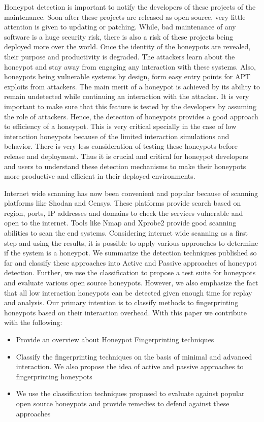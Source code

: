 \documentclass[letterpaper, 10 pt, conference]{ieeeconf}  %
\begin{document}
Honeypot detection is important to notify the developers of these projects of the maintenance. Soon after these projects are released as open source, very little attention is given to updating or patching. While, bad maintenance of any software is a huge security risk, there is also a risk of these projects being deployed more over the world. Once the identity of the honeypots are revealed, their purpose and productivity is degraded. The attackers learn about the honeypot and stay away from engaging any interaction with these systems. Also, honeypots being vulnerable systems by design, form easy entry points for APT exploits from attackers. The main merit of a honeypot is achieved by its ability to remain undetected while continuing an interaction with the attacker. It is very important to make sure that this feature is tested by the developers by assuming the role of attackers. Hence, the detection of honeypots provides a good approach to efficiency of a honeypot. This is very critical specially in the case of low interaction honeypots because of the limited interaction simulations and behavior. There is very less consideration of testing these honeypots before release and deployment. Thus it is crucial and critical for honeypot developers and users to understand these detection mechanisms to make their honeypots more productive and efficient in their deployed environments. 


Internet wide scanning has now been convenient and popular because of scanning platforms like Shodan and Censys. These platforms provide search based on region, ports, IP addresses and domains to check the services vulnerable and  open to the internet. Tools like Nmap \cite{NMap} and Xprobe2 provide good scanning abilities to scan the end systems. Considering internet wide scanning as a first step and using the results, it is possible to apply various approaches to determine if the system is a honeypot. We summarize the detection techniques published so far and classify these approaches into Active and Passive approaches of honeypot detection. Further, we use the classification to propose a test suite for honeypots and evaluate various open source honeypots. However, we also emphasize the fact that all low interaction honeypots can be detected given enough time for replay and analysis. Our primary intention is to classify methods to fingerprinting honeypots based on their interaction overhead. With this paper we contribute with the following:

 \begin{itemize}
    \item Provide an overview about Honeypot Fingerprinting techniques
    \item Classify the fingerprinting techniques on the basis of minimal and advanced interaction. We also propose the idea of active and passive approaches to fingerprinting honeypots
    \item We use the classification techniques proposed to evaluate against popular open source honeypots and provide remedies to defend against these approaches 
 \end{itemize}
\end{document}
